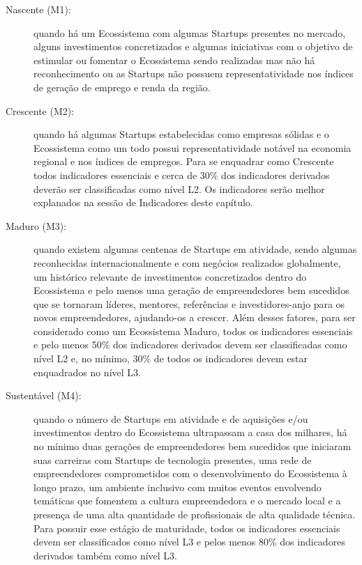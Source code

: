 \begin{description}
  \item [Nascente (M1):] quando há um Ecossistema com algumas Startups presentes no mercado, alguns investimentos concretizados e algumas iniciativas com o objetivo de estimular ou fomentar o Ecossistema sendo realizadas mas não há reconhecimento ou as Startups não possuem representatividade nos índices de geração de emprego e renda da região.

  \item [Crescente (M2):] quando há algumas Startups estabelecidas como empresas sólidas e o Ecossistema como um todo possui representatividade notável na economia regional e nos índices de empregos. Para se enquadrar como Crescente todos indicadores essenciais e cerca de 30\% dos indicadores derivados deverão ser classificadas como nível L2. Os indicadores serão melhor explanados na sessão de Indicadores deste capítulo.

  \item [Maduro (M3):] quando existem algumas centenas de Startups em atividade, sendo algumas reconhecidas internacionalmente e com negócios realizados globalmente, um histórico relevante de investimentos concretizados dentro do Ecossistema e pelo menos uma geração de empreendedores bem sucedidos que se tornaram líderes, mentores, referências e investidores-anjo para os novos empreendedores, ajudando-os a crescer. Além desses fatores, para ser considerado como um Ecossistema Maduro, todos os indicadores essenciais e pelo menos 50\% dos indicadores derivados devem ser classificadas como nível L2 e, no mínimo, 30\% de todos os indicadores devem estar enquadrados no nível L3.

  \item [Sustentável (M4):] quando o número de Startups em atividade e de aquisições e/ou investimentos dentro do Ecossistema ultrapassam a casa dos milhares, há no mínimo duas gerações de empreendedores bem sucedidos que iniciaram suas carreiras com Startups de tecnologia presentes, uma rede de empreendedores comprometidos com o desenvolvimento do Ecossistema à longo prazo, um ambiente inclusivo com muitos eventos envolvendo temáticas que fomentem a cultura empreendedora e o mercado local e a presença de uma alta quantidade de profissionais de alta qualidade técnica. Para possuir esse estágio de maturidade, todos os indicadores essenciais devem ser classificados como nível L3 e pelos menos 80\% dos indicadores derivados também como nível L3.
\end{description}

